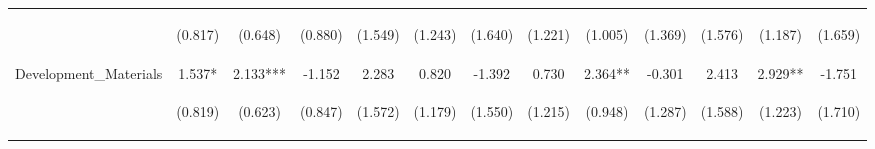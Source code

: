 \begin{tabular}{lcccccccccccc}
 & \begin{footnotesize}(0.817)\end{footnotesize} & \begin{footnotesize}(0.648)\end{footnotesize} & \begin{footnotesize}(0.880)\end{footnotesize} & \begin{footnotesize}(1.549)\end{footnotesize} & \begin{footnotesize}(1.243)\end{footnotesize} & \begin{footnotesize}(1.640)\end{footnotesize} & \begin{footnotesize}(1.221)\end{footnotesize} & \begin{footnotesize}(1.005)\end{footnotesize} & \begin{footnotesize}(1.369)\end{footnotesize} & \begin{footnotesize}(1.576)\end{footnotesize} & \begin{footnotesize}(1.187)\end{footnotesize} & \begin{footnotesize}(1.659)\end{footnotesize}\\
\noalign{\smallskip}Development_Materials & 1.537* & 2.133*** & -1.152 & 2.283 & 0.820 & -1.392 & 0.730 & 2.364** & -0.301 & 2.413 & 2.929** & -1.751\\
 & \begin{footnotesize}(0.819)\end{footnotesize} & \begin{footnotesize}(0.623)\end{footnotesize} & \begin{footnotesize}(0.847)\end{footnotesize} & \begin{footnotesize}(1.572)\end{footnotesize} & \begin{footnotesize}(1.179)\end{footnotesize} & \begin{footnotesize}(1.550)\end{footnotesize} & \begin{footnotesize}(1.215)\end{footnotesize} & \begin{footnotesize}(0.948)\end{footnotesize} & \begin{footnotesize}(1.287)\end{footnotesize} & \begin{footnotesize}(1.588)\end{footnotesize} & \begin{footnotesize}(1.223)\end{footnotesize} & \begin{footnotesize}(1.710)\end{footnotesize}\\

\end{tabular}
